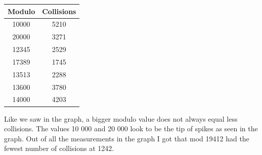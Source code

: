 \documentclass[a4paper, 11pt]{article}
\begin{document}
	\begin{center}
		\begin{tabular}{|c|c|}
			\hline
			\textbf{Modulo} & \textbf{Collisions} \\
			\hline
			10000 & 5210 \\
			\hline
			20000 & 3271 \\
			\hline
			12345 & 2529 \\
			\hline
			17389 & 1745 \\
			\hline
			13513 & 2288 \\
			\hline
			13600 & 3780 \\
			\hline
			14000 & 4203 \\
			\hline
		\end{tabular}
	\end{center}
	\par
	Like we saw in the graph, a bigger modulo value does not always equal less collisions.
	The values 10 000 and 20 000 look to be the tip of spikes as seen in the graph.
	Out of all the measurements in the graph I got that mod 19412 had the fewest number of collisions at 1242.
\end{document}
